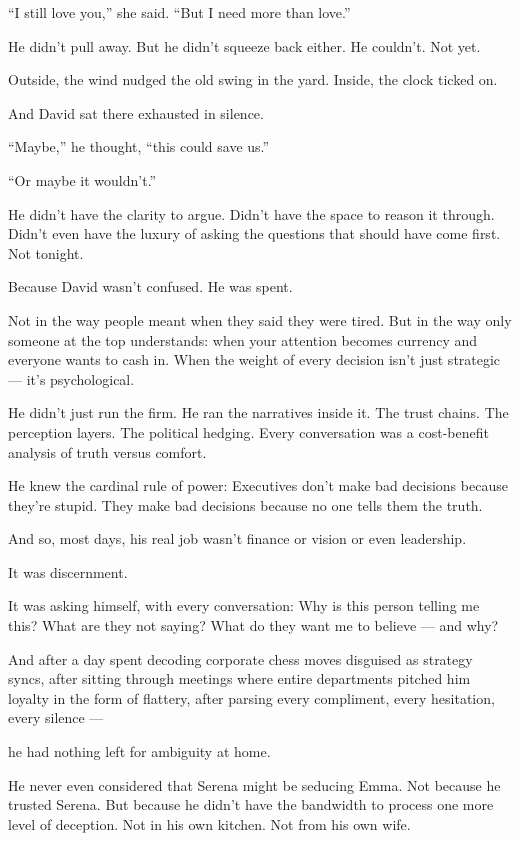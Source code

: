 “I still love you,” she said. “But I need more than love.”

He didn’t pull away. But he didn’t squeeze back either. He couldn’t. Not yet.

Outside, the wind nudged the old swing in the yard. Inside, the clock ticked on.

And David sat there exhausted in silence.

``Maybe,'' he thought, ``this could save us.''

``Or maybe it wouldn’t.''

He didn’t have the clarity to argue.
Didn’t have the space to reason it through.
Didn’t even have the luxury of asking the questions that should have come first.
Not tonight.

Because David wasn’t confused.
He was spent.

Not in the way people meant when they said they were tired.
But in the way only someone at the top understands: when your attention becomes currency and everyone wants to cash in.
When the weight of every decision isn’t just strategic — it’s psychological.

He didn’t just run the firm.
He ran the narratives inside it.
The trust chains. The perception layers. The political hedging.
Every conversation was a cost-benefit analysis of truth versus comfort.

He knew the cardinal rule of power:
Executives don’t make bad decisions because they’re stupid.
They make bad decisions because no one tells them the truth.

And so, most days, his real job wasn’t finance or vision or even leadership.

It was discernment.

It was asking himself, with every conversation:
Why is this person telling me this? What are they not saying? What do they want me to believe — and why?

And after a day spent decoding corporate chess moves disguised as strategy syncs,
after sitting through meetings where entire departments pitched him loyalty in the form of flattery,
after parsing every compliment, every hesitation, every silence —

he had nothing left for ambiguity at home.

He never even considered that Serena might be seducing Emma.
Not because he trusted Serena.
But because he didn’t have the bandwidth to process one more level of deception.
Not in his own kitchen.
Not from his own wife.

